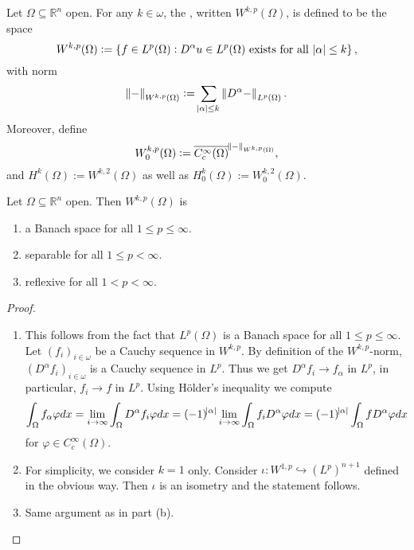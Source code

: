 \begin{definition}
	Let $\Omega \subseteq \mathbb{R}^n$ open. For any $k \in \omega$, the , written $W^{k,p}(\Omega)$, is defined to be the space
	\begin{equation*}
		W^{k,p}(\Omega) := \cbr[0]{f \in L^p(\Omega) : D^\alpha u \in L^p(\Omega) \text{ exists for all } \abs{\alpha} \leq k},
	\end{equation*}
	\noindent with norm
	\begin{equation*}
		\norm{-} _{W^{k,p}(\Omega)} := \sum_{\abs{\alpha} \leq k} \norm[0]{D^\alpha -}_{L^p(\Omega)}.
	\end{equation*}
	Moreover, define
	\begin{equation*}
		W^{k,p}_0(\Omega) := \overline{C^\infty_c(\Omega)}^{\norm{-}_{W^{k,p}(\Omega)}},
	\end{equation*}
	\noindent and $H^k(\Omega) := W^{k,2}(\Omega)$ as well as $H_0^k(\Omega) := W^{k,2}_0(\Omega)$.
\end{definition}

\begin{theorem}
	Let $\Omega \subseteq \mathbb{R}^n$ open. Then $W^{k,p}(\Omega)$ is
	\begin{enumerate}[label = \textup{(}\alph*\textup{)},wide = 0pt]
		\item a Banach space for all $1 \leq p \leq \infty$.
		\item separable for all $1 \leq p < \infty$.
		\item reflexive for all $1 < p < \infty$.
	\end{enumerate}
\end{theorem}

\begin{proof}
	~
	\begin{enumerate}[label = \textup{(}\alph*\textup{)},wide = 0pt]
		\item This follows from the fact that $L^p(\Omega)$ is a Banach space for all $1 \leq p \leq \infty$. Let $(f_i)_{i \in \omega}$ be a Cauchy sequence in $W^{k,p}$. By definition of the $W^{k,p}$-norm, $(D^\alpha f_i)_{i \in \omega}$ is a Cauchy sequence in $L^p$. Thus we get $D^\alpha f_i \to f_\alpha$ in $L^p$, in particular, $f_i \to f$ in $L^p$. Using H\"older's inequality we compute
			\begin{equation*}
				\int_\Omega f_\alpha \varphi dx = \lim_{i \to \infty} \int_\Omega D^\alpha f_i \varphi dx = (-1)^{\abs{\alpha}} \lim_{i \to \infty}\int_\Omega f_i D^\alpha \varphi dx = (-1)^{\abs{\alpha}}\int_\Omega f D^\alpha \varphi dx
			\end{equation*}
			\noindent for $\varphi \in C^\infty_c(\Omega)$.
		\item For simplicity, we consider $k = 1$ only. Consider $\iota : W^{1,p} \hookrightarrow (L^p)^{n + 1}$ defined in the obvious way. Then $\iota$ is an isometry and the statement follows. 
		\item Same argument as in part (b).
	\end{enumerate}
\end{proof}

